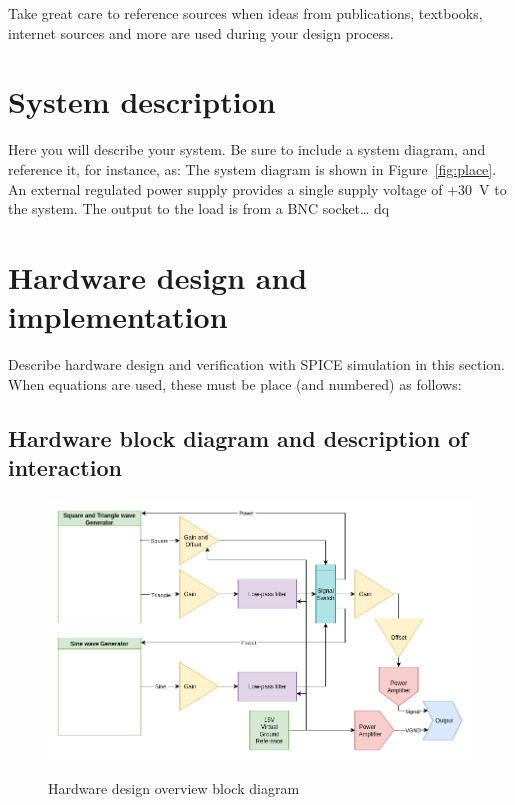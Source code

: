\documentclass[11pt,a4paper]{article}
\begin{document}
Take great care to reference sources when ideas from publications, textbooks, internet sources and more are used during your design process.


\section{System description}\label{sec:desc}
Here you will describe your system. Be sure to include a system diagram, and reference it, for instance, as: The system diagram is shown in Figure~\ref{fig:place}. An external regulated power supply provides a single supply voltage of +\SI{30}{\volt} to the system. The output to the load is from a BNC socket\ldots
dq

\newpage
\section{Hardware design and implementation}
Describe hardware design and verification with SPICE simulation in this section. When equations are used, these must be place (and numbered) as follows:

\subsection{Hardware block diagram and description of interaction}

\begin{figure}[H]
	\centering
	\begin{minipage}{0.8\textwidth}
		\centering
		\includegraphics[width=1\textwidth]{figures/hardware/hardware-design-overview-block-diagram.drawio.png}
		\caption{Hardware design overview block diagram}
		\label{fig:Hardware design overview block diagram}\textsf{}
	\end{minipage}
\end{figure}
\end{document}

